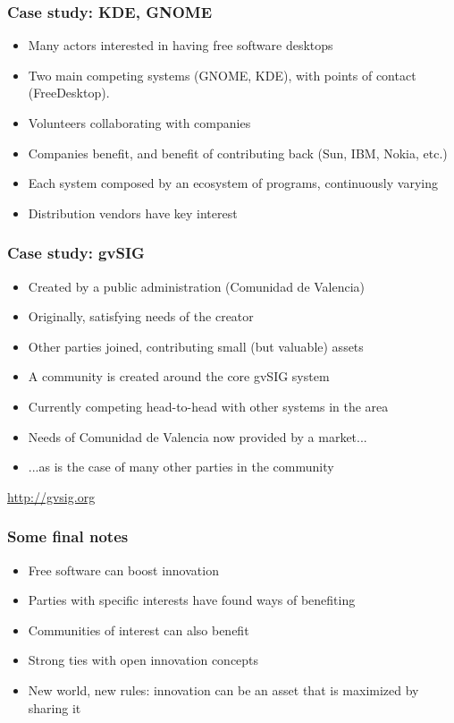\begin{frame}
\frametitle{Case study: KDE, GNOME}

\begin{itemize}
\item Many actors interested in having free software desktops
\item Two main competing systems (GNOME, KDE), with points of contact (FreeDesktop).
\item Volunteers collaborating with companies
\item Companies benefit, and benefit of contributing back (Sun, IBM, Nokia, etc.)
\item Each system composed by an ecosystem of programs, continuously varying
\item Distribution vendors have key interest
\end{itemize}

\end{frame}


\begin{frame}
\frametitle{Case study: gvSIG}

\begin{itemize}
\item Created by a public administration (Comunidad de Valencia)
\item Originally, satisfying needs of the creator
\item Other parties joined, contributing small (but valuable) assets
\item A community is created around the core gvSIG system
\item Currently competing head-to-head with other systems in the area
\item Needs of Comunidad de Valencia now provided by a market...
\item ...as is the case of many other parties in the community
\end{itemize}

\begin{flushright}
\url{http://gvsig.org}
\end{flushright}

\end{frame}


\begin{frame}
\frametitle{Some final notes}

\begin{itemize}
\item Free software can boost innovation
\item Parties with specific interests have found ways of benefiting
\item Communities of interest can also benefit
\item Strong ties with open innovation concepts
\item New world, new rules: innovation can be an asset that is maximized by sharing it
\end{itemize}

\end{frame}


